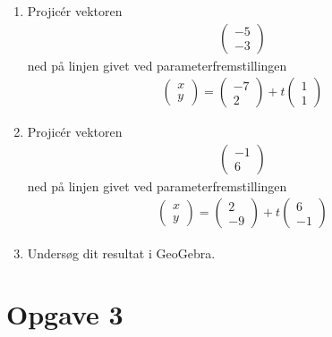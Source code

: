 \begin{enumerate}[label=\roman*)]
	\item Projicér vektoren 
	\begin{align*}
		\begin{pmatrix}
			-5 \\ -3
		\end{pmatrix}
	\end{align*}
	ned på linjen givet ved parameterfremstillingen
	\begin{align*}
		\begin{pmatrix}
			x \\ y
		\end{pmatrix} = 
		\begin{pmatrix}
			-7 \\ 2
		\end{pmatrix} + t
		\begin{pmatrix}
			1 \\ 1
		\end{pmatrix}
	\end{align*}
	\item Projicér vektoren 
	\begin{align*}
		\begin{pmatrix}
			-1 \\ 6
		\end{pmatrix}
	\end{align*}
	ned på linjen givet ved parameterfremstillingen
	\begin{align*}
		\begin{pmatrix}
			x \\ y
		\end{pmatrix} = 
		\begin{pmatrix}
			2 \\ -9
		\end{pmatrix} + t
		\begin{pmatrix}
			6 \\ -1
		\end{pmatrix}
	\end{align*}
	\item Undersøg dit resultat i GeoGebra.
\end{enumerate}

\section*{Opgave 3}

